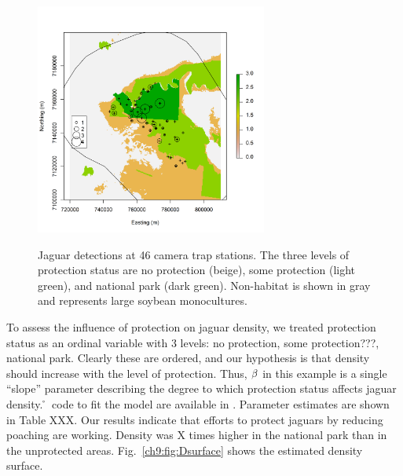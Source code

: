 \begin{figure}
\centering
\includegraphics[width=3in,height=3in]{Ch11/figs/jaguarCountMap}
\label{ch9:fig:jaguarCts}
\caption{Jaguar detections at 46 camera trap stations. The three levels of
  protection status are no protection (beige), some protection (light
  green), and national park (dark green). Non-habitat is shown in gray
  and represents large soybean monocultures. }
\end{figure}

To assess the influence of protection on jaguar density, we treated
protection status as an ordinal variable with 3 levels: no protection,
some protection???, national park. Clearly these are ordered, and our
hypothesis is that density should increase with the level of
protection. Thus, $\bf \beta$ in this example is a single ``slope''
parameter describing the degree to which protection status affects
jaguar density. \r~code to fit the model are available in
\scrbook. Parameter estimates are shown in Table XXX. Our results
indicate that efforts to protect jaguars by reducing poaching are
working. Density was X times higher in the national park than in the
unprotected areas. Fig.~\ref{ch9:fig:Dsurface} shows the estimated
density surface.


